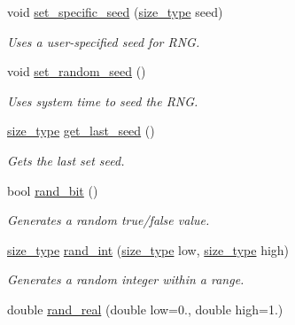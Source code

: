 \begin{DoxyCompactItemize}
\item 
void \hyperlink{classretrocombinator_1_1RandMaths_a0bf1c2e7a1eccb1f9246b3fceeb5db8a}{set\+\_\+specific\+\_\+seed} (\hyperlink{namespaceretrocombinator_a8e1541b50cee66a791df4c437ccbb385}{size\+\_\+type} seed)
\begin{DoxyCompactList}\small\item\em Uses a user-\/specified seed for R\+NG. \end{DoxyCompactList}\item 
void \hyperlink{classretrocombinator_1_1RandMaths_a2b61e31de6067ffa35531d5bde40f4c6}{set\+\_\+random\+\_\+seed} ()
\begin{DoxyCompactList}\small\item\em Uses system time to seed the R\+NG. \end{DoxyCompactList}\item 
\hyperlink{namespaceretrocombinator_a8e1541b50cee66a791df4c437ccbb385}{size\+\_\+type} \hyperlink{classretrocombinator_1_1RandMaths_ae3a186a8f3124cbfc698eeae09b708a0}{get\+\_\+last\+\_\+seed} ()
\begin{DoxyCompactList}\small\item\em Gets the last set seed. \end{DoxyCompactList}\item 
\mbox{\label{classretrocombinator_1_1RandMaths_a4f82863502ca04438a331fd309ca8b5e}} 
bool \hyperlink{classretrocombinator_1_1RandMaths_a4f82863502ca04438a331fd309ca8b5e}{rand\+\_\+bit} ()
\begin{DoxyCompactList}\small\item\em Generates a random true/false value. \end{DoxyCompactList}\item 
\hyperlink{namespaceretrocombinator_a8e1541b50cee66a791df4c437ccbb385}{size\+\_\+type} \hyperlink{classretrocombinator_1_1RandMaths_a8072bad64e64ef042e5257e1bee85635}{rand\+\_\+int} (\hyperlink{namespaceretrocombinator_a8e1541b50cee66a791df4c437ccbb385}{size\+\_\+type} low, \hyperlink{namespaceretrocombinator_a8e1541b50cee66a791df4c437ccbb385}{size\+\_\+type} high)
\begin{DoxyCompactList}\small\item\em Generates a random integer within a range. \end{DoxyCompactList}\item 
double \hyperlink{classretrocombinator_1_1RandMaths_aa6441baa59bff50f588c0c54e3c54140}{rand\+\_\+real} (double low=0., double high=1.)

\end{DoxyCompactItemize}
